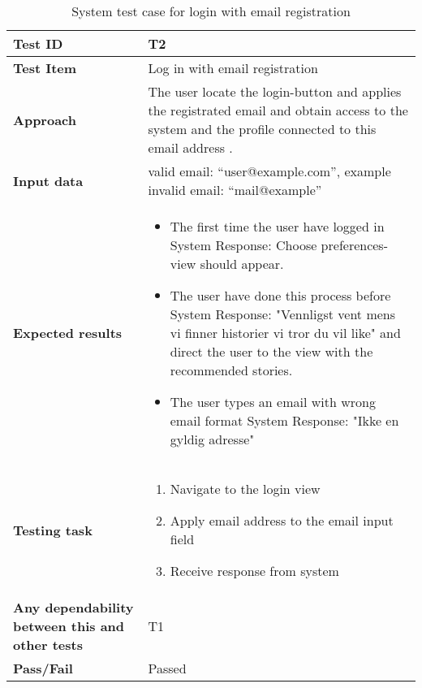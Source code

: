 \begin{center}	
	\begin{table}[H]
		\begin{tabular}{ | p{4cm} | p{12cm}  |}
			\hline
			\textbf{Test ID} & T2  \\ \hline 
			\textbf{Test Item} & Log in with email registration \\ \hline
			\textbf{Approach} & The user locate the login-button and applies the registrated email and obtain access to the system and the profile connected to this email address . \\ \hline
			\textbf{Input data} &  valid email: “user@example.com”, \newline example invalid email: “mail@example”\\ \hline
			\textbf{Expected results} & 
			\begin{itemize}[noitemsep]
				\item The first time the user have logged in \newline System Response:  Choose preferences-view should appear.
				\item The user have done this process before \newline System Response: "Vennligst vent mens vi finner historier vi tror du vil like" and direct the user to the view with the recommended stories.
				\item The user types an email with wrong email format \newline System Response: "Ikke en gyldig adresse" 
				
			\end{itemize}
			 \\ \hline
			\textbf{Testing task} & 
			\begin{enumerate}[noitemsep]
			\item Navigate to the login view
			\item Apply email address to the email input field
			\item Receive response from system
			\end{enumerate}
			 \\ \hline
			\textbf{Any dependability between this and other tests} & T1 \\ \hline					
			\textbf{Pass/Fail} & Passed \\\hline
		\end{tabular}
	\caption{System test case for login with email registration}
	\label{Tab_systemTesting2}
	\end{table}
\end{center}

